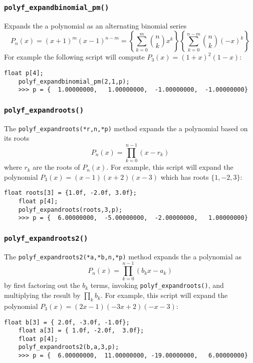 \subsubsection{{\tt polyf\_expandbinomial\_pm()}}
\label{module:math:poly:polyf_expandbinomial_pm}
Expands the a polynomial as an alternating binomial series
%
\begin{equation}
\label{eqn:math:poly:expandbinomial_pm}
    P_n(x) = (x+1)^m (x-1)^{n-m}
           = \left\{ \sum_{k=0}^{m}  { {n \choose k}    x^k} \right\}
             \left\{ \sum_{k=0}^{n-m}{ {n \choose k} (-x)^k} \right\}
\end{equation}
%
For example the following script will compute
$P_3(x) = (1+x)^2(1-x)$:
%
\begin{Verbatim}[fontsize=\small]
    float p[4];
    polyf_expandbinomial_pm(2,1,p);
    >>> p = {  1.00000000,   1.00000000,  -1.00000000,  -1.00000000}
\end{Verbatim}
%

\subsubsection{{\tt polyf\_expandroots()}}
\label{module:math:poly:polyf_expandroots}
The {\tt polyf\_expandroots(*r,n,*p)} method
expands the a polynomial based on its roots
%
\begin{equation}
\label{eqn:math:poly:expandroots}
    P_n(x) = \prod_{k=0}^{n-1}{(x - r_k)}
\end{equation}
%
where $r_k$ are the roots of $P_n(x)$.
For example, this script will expand the polynomial
$P_3(x) = (x-1)(x+2)(x-3)$ which has roots
$\{1,-2,3\}$:
%
\begin{Verbatim}[fontsize=\small]
    float roots[3] = {1.0f, -2.0f, 3.0f};
    float p[4];
    polyf_expandroots(roots,3,p);
    >>> p = {  6.00000000,  -5.00000000,  -2.00000000,   1.00000000}
\end{Verbatim}
%

\subsubsection{{\tt polyf\_expandroots2()}}
\label{module:math:poly:polyf_expandroots2}
The {\tt polyf\_expandroots2(*a,*b,n,*p)} method
expands the a polynomial as
%
\begin{equation}
\label{eqn:math:poly:expandroots2}
    P_n(x) = \prod_{k=0}^{n-1}{(b_kx-a_k)}
\end{equation}
%
by first factoring out the $b_k$ terms,
invoking {\tt polyf\_expandroots()}, and
multiplying the result by $\prod_k{b_k}$.
For example, this script will expand the polynomial
$P_3(x) = (2x-1)(-3x+2)(-x-3)$:
%
\begin{Verbatim}[fontsize=\small]
    float b[3] = { 2.0f, -3.0f, -1.0f};
    float a[3] = { 1.0f, -2.0f,  3.0f};
    float p[4];
    polyf_expandroots2(b,a,3,p);
    >>> p = {  6.00000000,  11.00000000, -19.00000000,   6.00000000}
\end{Verbatim}
%



